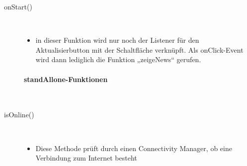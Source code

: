 \begin{description}
 
\item[onStart()]~\par
\begin{itemize}
\item in dieser Funktion wird nur noch der Listener für den Aktualisierbutton mit der Schaltfläche verknüpft. Als onClick-Event wird dann lediglich die Funktion „zeigeNews“ gerufen.
\end{itemize}

\newpage
 
\paragraph{standAllone-Funktionen}
\  \\[1em]
\item[isOnline()]~\par
\begin{itemize}
\item Diese Methode prüft durch einen Connectivity Manager, ob eine Verbindung zum Internet besteht
\end{itemize}


\end{description}

